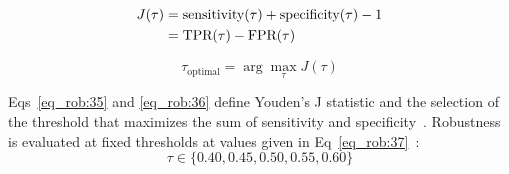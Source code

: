 \documentclass[10pt,letterpaper]{article}
\begin{document}
                                                                                                                  \begin{align}
                                                                                                                  J(\tau) &= \text{sensitivity}(\tau) + \text{specificity}(\tau) - 1  \label{eq_rob:35}\\
                                                                                                                          &= \text{TPR}(\tau) - \text{FPR}(\tau) \notag
                                                                                                                          \end{align}

                                                                                                                          \begin{equation} \label{eq_rob:36}
                                                                                                                          \tau_{\text{optimal}} = \arg\max_{\tau} J(\tau)
                                                                                                                          \end{equation}

                                                                                                                          Eqs~\eqref{eq_rob:35} and \eqref{eq_rob:36} define Youden's J statistic and the selection of the threshold that maximizes the sum of sensitivity and specificity~\cite{ref61}. Robustness is evaluated at fixed thresholds at values given in Eq~\eqref{eq_rob:37}~\cite{ref60}:
                                                                                                                          \begin{equation} \label{eq_rob:37}
                                                                                                                          \tau \in \{0.40,0.45,0.50,0.55,0.60\}
                                                                                                                          \end{equation}
\end{document}

